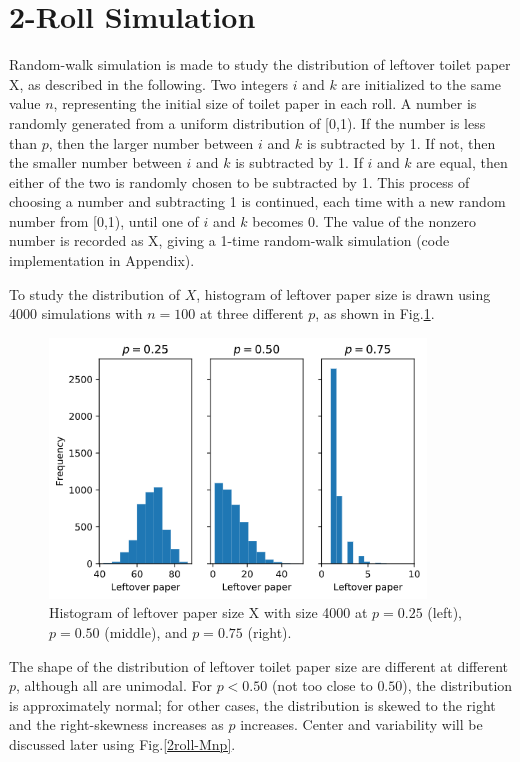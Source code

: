 \documentclass{article}
\begin{document}
\section{2-Roll Simulation}
Random-walk simulation is made to study the distribution of leftover toilet paper X, as described in the following. Two integers $i$ and $k$ are initialized to the same value $n$, representing the initial size of toilet paper in each roll. A number is randomly generated from a uniform distribution of [0,1). If the number is less than $p$, then the larger number between $i$ and $k$ is subtracted by 1. If not, then the smaller number between $i$ and $k$ is subtracted by 1. If $i$ and $k$ are equal, then either of the two is randomly chosen to be subtracted by 1. This process of choosing a number and subtracting 1 is continued, each time with a new random number from [0,1), until one of $i$ and $k$ becomes 0. The value of the nonzero number is recorded as X, giving a 1-time random-walk simulation (code implementation in Appendix). 

To study the distribution of $X$, histogram of leftover paper size is drawn using 4000 simulations with $n=100$ at three different $p$, as shown in Fig.\ref{2roll-Histogram}.
\begin{figure}[ht]
    \centering
    \includegraphics[width=10cm]{hist-2roll.png}
    \caption{Histogram of leftover paper size X with size 4000 at $p=0.25$ (left), $p=0.50$ (middle), and $p=0.75$ (right).}
    \label{2roll-Histogram}
\end{figure}
The shape of the distribution of leftover toilet paper size are different at different $p$, although all are unimodal. For $p<0.50$ (not too close to $0.50$), the distribution is approximately normal; for other cases, the distribution is skewed to the right and the right-skewness increases as $p$ increases. Center and variability will be discussed later using Fig.\ref{2roll-Mnp}.
\end{document}
